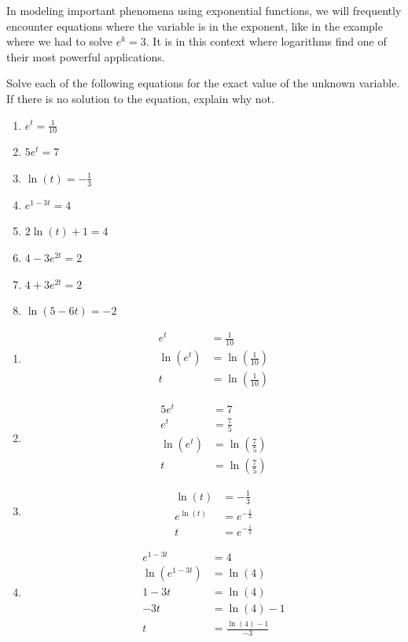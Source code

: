 \documentclass[nooutcomes]{ximera}
\begin{document}
In modeling important phenomena using exponential functions, we will frequently encounter equations where the variable is in the exponent, like in the example where we had to solve \(e^k = 3\).  It is in this context where logarithms find one of their most powerful applications.  
\begin{example}
Solve each of the following equations for the exact value of the unknown variable.  If there is no solution to the equation, explain why not.%

\begin{enumerate}
\item
\(e^t = \frac{1}{10}\)%
\item
\(5e^{t}=7\)%
\item
\(\ln(t) = -\frac{1}{3}\)%
\item
\(e^{1-3t} = 4\)%
\item
\(2\ln(t) + 1 = 4\)%
\item
\(4 - 3e^{2t} = 2\)%
\item
\(4 + 3e^{2t} = 2\)%
\item
\(\ln(5 - 6t) = -2\)%
\end{enumerate}
\begin{explanation}
\begin{enumerate}[label=\alph*.]
\item
\begin{align*}
e^t &= \frac{1}{10}\\
\ln(e^t) &= \ln{\left(\frac{1}{10}\right)}\\
t&=\ln{\left(\frac{1}{10}\right)}
\end{align*}
\item
\begin{align*}
5e^{t}&=7\\
e^{t}&=\frac{7}{5}\\
\ln{(e^{t})}&=\ln{\left(\frac{7}{5}\right)}\\
t &=\ln{\left(\frac{7}{5}\right)}
\end{align*}
\item
\begin{align*}
\ln(t) &= -\frac{1}{3}\\
e^{\ln(t)} &=e^{-\frac{1}{3}}\\
t &=e^{-\frac{1}{3}}
\end{align*}
\item

\begin{align*}
e^{1-3t} &= 4\\
\ln(e^{1-3t}) &= \ln(4)\\
1-3t &= \ln(4)\\
-3t &= \ln(4)-1\\
t &= \frac{\ln(4)-1}{-3}
\end{align*}


\end{enumerate}
\end{explanation}
\end{example}
\end{document}
